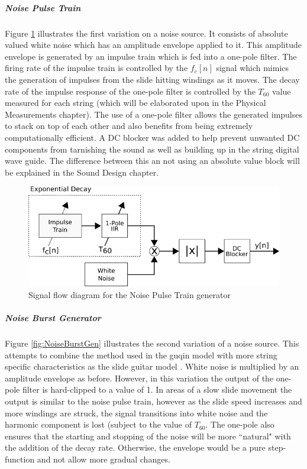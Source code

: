 \documentclass[../main.tex]{subfiles}
\begin{document}
\subparagraph{Noise Pulse Train}
Figure \ref{fig:NoisePulseTrain} illustrates the first variation on a noise source. It consists of absolute valued white noise which has an amplitude envelope applied to it. This amplitude envelope is generated by an impulse train which is fed into a one-pole filter. The firing rate of the impulse train is controlled by the $f_c[n]$ signal which mimics the generation of impulses from the slide hitting windings as it moves. The decay rate of the impulse response of the one-pole filter is controlled by the $T_{60}$ value measured for each string (which will be elaborated upon in the Physical Measurements chapter). The use of a one-pole filter allows the generated impulses to stack on top of each other and also benefits from being extremely computationally efficient. A DC blocker was added to help prevent unwanted DC components from tarnishing the sound as well as building up in the string digital wave guide. The difference between this an not using an absolute value block will be explained in the Sound Design chapter.

\begin{figure}[h]
    \centering
    \includegraphics[scale=.5]{./images/diagrams/NoisePulseTrain.png}
    \caption{Signal flow diagram for the Noise Pulse Train generator}
    \label{fig:NoisePulseTrain}
\end{figure}

\subparagraph{Noise Burst Generator}
Figure \ref{fig:NoiseBurstGen} illustrates the second variation of a noise source. This attempts to combine the method used in the guqin model  with more string specific characteristics as the slide guitar model . White noise is multiplied by an amplitude envelope as before. However, in this variation the output of the one-pole filter is hard-clipped to a value of 1. In areas of a slow slide movement the output is similar to the noise pulse train, however as the slide speed increases and more windings are struck, the signal transitions into white noise and the harmonic component is lost (subject to the value of $T_{60}$. The one-pole also ensures that the starting and stopping of the noise will be more ``natural" with the addition of the decay rate. Otherwise, the envelope would be a pure step-function and not allow more gradual changes.
\end{document}
